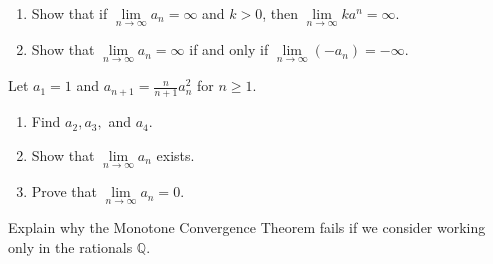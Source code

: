 \documentclass{ximera}
\begin{document}
\begin{exercise}
    \begin{enumerate}
        \item Show that if $\lim\limits_{n\to\infty} a_n = \infty$ and $k>0$, then $\lim\limits_{n\to\infty} ka^n = \infty$.
        \item  Show that $\lim\limits_{n\to\infty} a_n = \infty$ if and only if $\lim\limits_{n\to\infty} (-a_n) = -\infty$.
    \end{enumerate}
\end{exercise}

\begin{exercise}
    Let $a_1=1$ and $a_{n+1} = \frac{n}{n+1}a_n^2$ for $n\geq 1$.
    \begin{enumerate}
        \item Find $a_2, a_3,$ and  $a_4$.
        \item Show that $\lim\limits_{n\to\infty} a_n$ exists.
        \item Prove that $\lim\limits_{n\to\infty} a_n=0.$
    \end{enumerate}
\end{exercise}

\begin{exercise}
    Explain why the Monotone Convergence Theorem fails if we consider working only in the rationals $\mathbb{Q}$.
\end{exercise}
\end{document}
